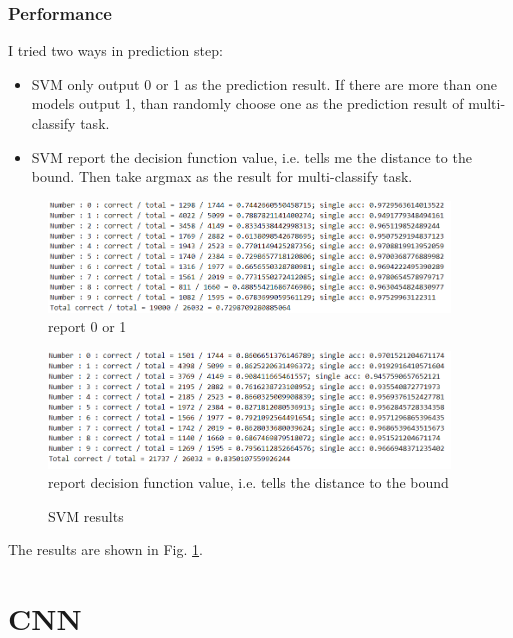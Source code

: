 \documentclass{article}
\begin{document}
\subsubsection{Performance}
I tried two ways in prediction step:
\begin{itemize}
    \item SVM only output 0 or 1 as the prediction result. If there are more than one models output 1, than randomly choose one as the prediction result of multi-classify task.
    \item SVM report the decision function value, i.e. tells me the distance to the bound. Then take argmax as the result for multi-classify task. 
\end{itemize}
\begin{figure}[H]
    \centering
    \begin{minipage}{0.48\textwidth}
        \centering
        \includegraphics[width=0.95\textwidth]{fig/svm/1.png}
        report 0 or 1
    \end{minipage}
    \begin{minipage}{0.48\textwidth}
        \centering
        \includegraphics[width=0.95\textwidth]{fig/svm/2.png}
        report decision function value, i.e. tells the distance to the bound
    \end{minipage}
    \caption{SVM results}
    \label{svmresult}
\end{figure}
The results are shown in Fig. \ref{svmresult}.
\section{CNN}
\end{document}
